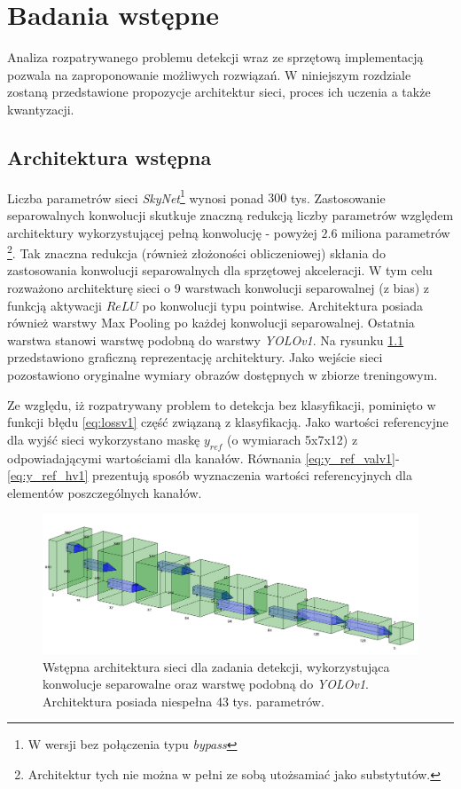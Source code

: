 \chapter{Badania wstępne}
\label{cha:Badania wstępne}

Analiza rozpatrywanego problemu detekcji wraz ze sprzętową implementacją pozwala na zaproponowanie możliwych rozwiązań. W niniejszym rozdziale zostaną przedstawione propozycje architektur sieci, proces ich uczenia a także kwantyzacji. 

\section{Architektura wstępna} %

Liczba parametrów sieci \emph{SkyNet}\footnote{W wersji bez połączenia typu \emph{bypass}} wynosi ponad $300$ tys. 
Zastosowanie separowalnych konwolucji skutkuje znaczną redukcją liczby parametrów względem architektury wykorzystującej pełną konwolucję - powyżej $2.6$ miliona parametrów \footnote{Architektur tych nie można w pełni ze sobą utożsamiać jako substytutów.}. 
Tak znaczna redukcja (również złożoności obliczeniowej) skłania do zastosowania konwolucji separowalnych dla sprzętowej akceleracji. 
W tym celu rozważono architekturę sieci o 9 warstwach konwolucji separowalnej (z bias) z funkcją aktywacji $ReLU$ po konwolucji typu pointwise. Architektura posiada również warstwy Max Pooling po każdej konwolucji separowalnej.
Ostatnia warstwa stanowi warstwę podobną do warstwy \emph{YOLOv1}. Na rysunku \ref{fig:arch_v1} przedstawiono graficzną reprezentację architektury. 
Jako wejście sieci pozostawiono oryginalne wymiary obrazów dostępnych w zbiorze treningowym.

Ze względu, iż rozpatrywany problem to detekcja bez klasyfikacji, pominięto w funkcji błędu \eqref{eq:lossv1} część związaną z klasyfikacją. 
Jako wartości referencyjne dla wyjść sieci wykorzystano maskę $y_{ref}$ (o wymiarach 5x7x12) z odpowiadającymi wartościami dla kanałów. Równania \eqref{eq:y_ref_valv1}-\eqref{eq:y_ref_hv1} prezentują sposób wyznaczenia wartości referencyjnych dla elementów poszczególnych kanałów. 

\begin{figure}
    \centering
    \includegraphics[width=\linewidth]{images/arch_v1.png}
    \caption{Wstępna architektura sieci dla zadania detekcji, wykorzystująca konwolucje separowalne oraz warstwę podobną do \emph{YOLOv1}. Architektura posiada niespełna 43 tys. parametrów.}
    \label{fig:arch_v1}
\end{figure}

